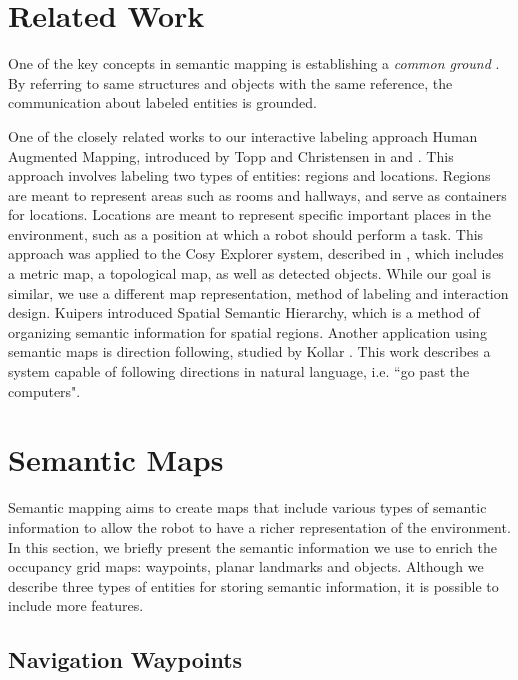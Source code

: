 \section{Related Work}
\label{sec:map_relevant_work}

One of the key concepts in semantic mapping is establishing a \textit{common ground} \cite{clark1991grounding}. By referring to same structures and objects with the same reference, the communication about labeled entities is grounded.

One of the closely related works to our interactive labeling approach Human Augmented Mapping, introduced by Topp and Christensen in \cite{topp2006topological} and \cite{topp2010detecting}. This approach involves labeling two types of entities: regions and locations. Regions are meant to represent areas such as rooms and hallways, and serve as containers for locations. Locations are meant to represent specific important places in the environment, such as a position at which a robot should perform a task. This approach was applied to the Cosy Explorer system, described in \cite{zender2007integrated}, which includes a metric map, a topological map, as well as detected objects. While our goal is similar, we use a different map representation, method of labeling and interaction design. Kuipers \cite{kuipers2000spatial} introduced Spatial Semantic Hierarchy, which is a method of organizing semantic information for spatial regions. Another application using semantic maps is direction following, studied by Kollar \cite{kollar2010toward}. This work describes a system capable of following directions in natural language, i.e. ``go past the computers".

\section{Semantic Maps}
\label{sec:map_semantic_maps}

Semantic mapping aims to create maps that include various types of semantic information to allow the robot to have a richer representation of the environment. In this section, we briefly present the semantic information we use to enrich the occupancy grid maps: waypoints, planar landmarks and objects. Although we describe three types of entities for storing semantic information, it is possible to include more features.

\subsection{Navigation Waypoints}
\label{sec:map_waypoints}

